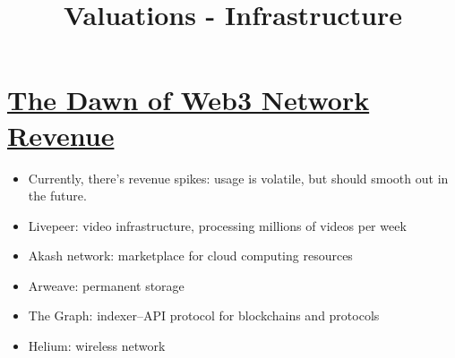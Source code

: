 \documentclass{../../notes}
\title{Valuations - Infrastructure}
\begin{document}
\maketitle

\section{\href{run:./the-dawn-of-web3-network-revenue.pdf}{The Dawn of Web3 Network Revenue}}
\begin{itemize}
    \item Currently, there's revenue spikes: usage is volatile, but should smooth out in the future. 
    \item Livepeer: video infrastructure, processing millions of videos per week
    \item Akash network: marketplace for cloud computing resources
    \item Arweave: permanent storage
    \item The Graph: indexer--API protocol for blockchains and protocols
    \item Helium: wireless network
\end{itemize}
\end{document}

